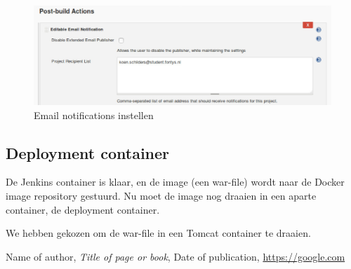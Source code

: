 \documentclass[12pt]{article}
\begin{document}
\begin{figure}[H]
	\begin{center}
		\includegraphics[width=1.0\textwidth]{images/Postbuildaction.PNG}
		\caption{Email notifications instellen\label{fig:jenkins_config_email_notifications}}
	\end{center}
\end{figure}


\subsection{Deployment container}
De Jenkins container is klaar, en de image (een war-file) wordt naar de Docker image repository gestuurd. Nu moet de image nog draaien in een aparte container, de deployment container.

We hebben gekozen om de war-file in een Tomcat container te draaien. 






\begin{thebibliography}{9}
		Name of author,
		\textit{Title of page or book},
		Date of publication,
		\url{https://google.com}
\end{thebibliography}
\end{document}
